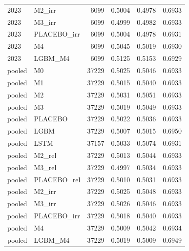 \begin{tabular}{llrrrr}
2023 & M2\_irr & 6099 & 0.5004 & 0.4978 & 0.6933 \\
2023 & M3\_irr & 6099 & 0.4999 & 0.4982 & 0.6933 \\
2023 & PLACEBO\_irr & 6099 & 0.5004 & 0.4978 & 0.6931 \\
2023 & M4 & 6099 & 0.5045 & 0.5019 & 0.6930 \\
2023 & LGBM\_M4 & 6099 & 0.5125 & 0.5153 & 0.6929 \\
pooled & M0 & 37229 & 0.5025 & 0.5046 & 0.6933 \\
pooled & M1 & 37229 & 0.5015 & 0.5040 & 0.6933 \\
pooled & M2 & 37229 & 0.5031 & 0.5051 & 0.6933 \\
pooled & M3 & 37229 & 0.5019 & 0.5049 & 0.6933 \\
pooled & PLACEBO & 37229 & 0.5022 & 0.5036 & 0.6933 \\
pooled & LGBM & 37229 & 0.5007 & 0.5015 & 0.6950 \\
pooled & LSTM & 37157 & 0.5033 & 0.5074 & 0.6931 \\
pooled & M2\_rel & 37229 & 0.5013 & 0.5044 & 0.6933 \\
pooled & M3\_rel & 37229 & 0.4997 & 0.5034 & 0.6933 \\
pooled & PLACEBO\_rel & 37229 & 0.5010 & 0.5031 & 0.6933 \\
pooled & M2\_irr & 37229 & 0.5025 & 0.5048 & 0.6933 \\
pooled & M3\_irr & 37229 & 0.5026 & 0.5046 & 0.6933 \\
pooled & PLACEBO\_irr & 37229 & 0.5018 & 0.5040 & 0.6933 \\
pooled & M4 & 37229 & 0.5009 & 0.5042 & 0.6934 \\
pooled & LGBM\_M4 & 37229 & 0.5019 & 0.5009 & 0.6949 \\
\bottomrule
\end{tabular}
